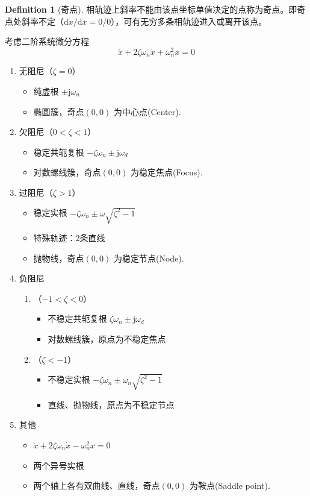 \documentclass[14pt,a4paper]{article}
\theoremstyle{plain}
\theoremstyle{definition}
\newtheorem*{dfn}{Definition}
\theoremstyle{remark}
\theoremstyle{plain}
\theoremstyle{plain}
\theoremstyle{plain}
\theoremstyle{definition}
\theoremstyle{remark}
\numberwithin{equation}{section}
\begin{document}
			\begin{dfn}[奇点]  
			\label{dfn:奇点}
				相轨迹上斜率不能由该点坐标单值决定的点称为奇点。即奇点处斜率不定（$\mathrm d\dot x / \mathrm dx = 0 / 0$），可有无穷多条相轨迹进入或离开该点。
			\end{dfn} 
				考虑二阶系统微分方程
				\[
							\ddot x + 2\zeta \omega_{n} \dot x + \omega_{n}^2 x = 0 
				\] 
				\begin{enumerate}
					\item 无阻尼（$\zeta=0$）
						\begin{itemize}
							\item 纯虚根 $\pm \mathrm{j} \omega_{n}$ 
							\item 椭圆簇，奇点$\left( 0,0 \right)$ 为中心点(Center).
						\end{itemize} 
					\item 欠阻尼（$0<\zeta < 1$）
						\begin{itemize}
							\item 稳定共轭复根 $-\zeta \omega_{n} \pm \mathrm{j} \omega_{d}$ 
							\item 对数螺线簇，奇点$\left( 0,0 \right)$ 为稳定焦点(Focus). 
						\end{itemize} 
					\item 过阻尼（$\zeta > 1$） 
						\begin{itemize}
							\item 稳定实根 $-\zeta \omega_{n} \pm \omega \sqrt{\zeta^2-1} $ 
							\item 特殊轨迹：2条直线 
							\item 抛物线，奇点$\left( 0,0 \right)$ 为稳定节点(Node).  
						\end{itemize}  
					\item 负阻尼 
						\begin{enumerate}
							\item（$-1<\zeta<0$） 
								\begin{itemize}
									\item 不稳定共轭复根 $\zeta \omega_{n} \pm \mathrm{j} \omega_d$ 
									\item 对数螺线簇，原点为不稳定焦点
								\end{itemize}  
							\item（$\zeta<-1$） 
								\begin{itemize}
									\item 不稳定实根 $-\zeta \omega_{n} \pm \omega_{n} \sqrt{\zeta^2-1}$  
									\item 直线、抛物线，原点为不稳定节点
								\end{itemize}  
						\end{enumerate} 
					\item 其他
						\begin{itemize}
							\item $\ddot x + 2\zeta \omega_{n} \dot x - \omega_{n}^2x = 0$ 
							\item 两个异号实根
							\item 两个轴上各有双曲线、直线，奇点$\left( 0,0 \right)$ 为鞍点(Saddle point). 
						\end{itemize}  
				\end{enumerate} 
	
\end{document}
